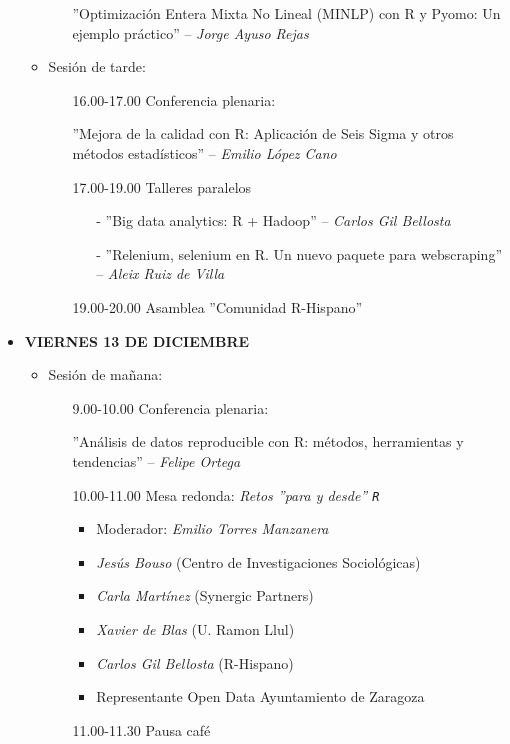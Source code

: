 \begin{itemize}
\begin{itemize}
\begin{itemize}
    ''Optimización Entera Mixta No Lineal (MINLP) con R y Pyomo: Un ejemplo 
    práctico'' -- \emph{Jorge Ayuso Rejas}    
  \end{itemize}
  \item Sesión de tarde:
    \begin{itemize}
      \item[]16.00-17.00 Conferencia plenaria:
    
      ''Mejora de la calidad con R: Aplicación de Seis Sigma y otros 
      métodos estadísticos'' -- \emph{Emilio López Cano}
      \item[] 17.00-19.00 Talleres paralelos
      \begin{enumerate}
      \item[-] ''Big data analytics: R + Hadoop'' -- \emph{Carlos Gil Bellosta}
      \item[-] ''Relenium, selenium en R. Un nuevo paquete para webscraping''
       -- \emph{Aleix Ruiz de Villa}
      \end{enumerate}
      \item[]19.00-20.00 Asamblea ''Comunidad R-Hispano''
    \end{itemize}
  
\end{itemize}
 

 

\item \textsc{\textbf{VIERNES 13 DE DICIEMBRE}}
  \begin{itemize}
  \item Sesión de mañana:
    \begin{itemize}
    \item[] 9.00-10.00  Conferencia plenaria: 

    ''Análisis de datos reproducible con R: métodos, herramientas y tendencias''     -- \emph{Felipe Ortega}

    \item[] 10.00-11.00 Mesa redonda: \textsl{Retos ''para y desde'' \texttt{R}}
      \begin{itemize}
      \item Moderador: \emph{Emilio Torres Manzanera}
      \item \emph{Jesús Bouso} (Centro de Investigaciones Sociológicas)
      \item \emph{Carla Martínez} (Synergic Partners)
      \item \emph{Xavier de Blas} (U. Ramon Llul)
      \item \emph{Carlos Gil Bellosta} (R-Hispano)
      \item Representante Open Data Ayuntamiento de Zaragoza
      \end{itemize}
    \item[]11.00-11.30 Pausa café


\end{itemize}
\end{itemize}
\end{itemize}
